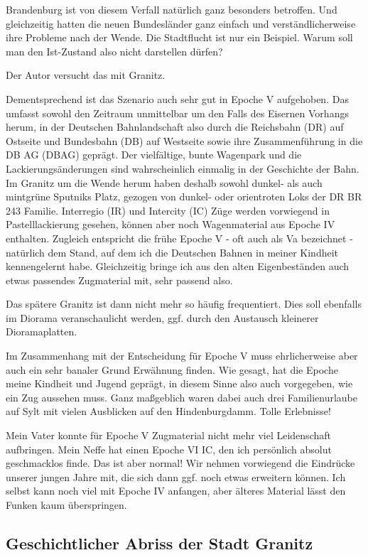 Brandenburg ist von diesem Verfall nat\"urlich ganz besonders betroffen.
Und gleichzeitig hatten die neuen Bundesl\"ander ganz einfach und verst\"andlicherweise ihre Probleme nach der Wende.
Die Stadtflucht ist nur ein Beispiel.
Warum soll man den Ist-Zustand also nicht darstellen d\"urfen?

Der Autor versucht das mit Granitz.

Dementsprechend ist das Szenario auch sehr gut in Epoche V aufgehoben.
Das umfasst sowohl den Zeitraum unmittelbar um den Falls des Eisernen Vorhangs herum, in der Deutschen Bahnlandschaft also durch die Reichsbahn (DR) auf Ostseite und Bundesbahn (DB) auf Westseite sowie ihre Zusammenf\"uhrung in die DB AG (DBAG) gepr\"agt.
Der vielf\"altige, bunte Wagenpark und die Lackierungs\"anderungen sind wahrscheinlich einmalig in der Geschichte der Bahn.
Im Granitz um die Wende herum haben deshalb sowohl dunkel- als auch mintgr\"une Sputniks Platz, gezogen von dunkel- oder orientroten Loks der DR BR 243 Familie.
Interregio (IR) und Intercity (IC) Z\"uge werden vorwiegend in Pastelllackierung gesehen, k\"onnen aber noch Wagenmaterial aus Epoche IV enthalten.
Zugleich entspricht die fr\"uhe Epoche V - oft auch als Va bezeichnet - nat\"urlich dem Stand, auf dem ich die Deutschen Bahnen in meiner Kindheit kennengelernt habe.
Gleichzeitig bringe ich aus den alten Eigenbest\"anden auch etwas passendes Zugmaterial mit, sehr passend also.

Das sp\"atere Granitz ist dann nicht mehr so h\"aufig frequentiert.
Dies soll ebenfalls im Diorama veranschaulicht werden, ggf. durch den Austausch kleinerer Dioramaplatten.

Im Zusammenhang mit der Entscheidung f\"ur Epoche V muss ehrlicherweise aber auch ein sehr banaler Grund Erw\"ahnung finden.
Wie gesagt, hat die Epoche meine Kindheit und Jugend gepr\"agt, in diesem Sinne also auch vorgegeben, wie ein Zug aussehen muss.
Ganz ma{\ss}geblich waren dabei auch drei Familienurlaube auf Sylt mit vielen Ausblicken auf den Hindenburgdamm.
Tolle Erlebnisse!

Mein Vater konnte f\"ur Epoche V Zugmaterial nicht mehr viel Leidenschaft aufbringen.
Mein Neffe hat einen Epoche VI IC, den ich pers\"onlich absolut geschmacklos finde.
Das ist aber normal!
Wir nehmen vorwiegend die Eindr\"ucke unserer jungen Jahre mit, die sich dann ggf. noch etwas erweitern k\"onnen.
Ich selbst kann noch viel mit Epoche IV anfangen, aber \"alteres Material l\"asst den Funken kaum \"uberspringen.


\subsection{Geschichtlicher Abriss der Stadt Granitz}
\label{sec:storyOfGranitz}


